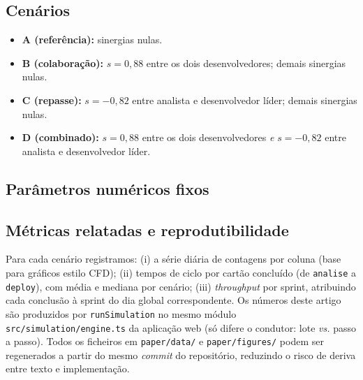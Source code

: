 \subsection{Cenários}
\begin{itemize}
  \item \textbf{A (referência):} sinergias nulas.
  \item \textbf{B (colaboração):} $s=0{,}88$ entre os dois desenvolvedores; demais sinergias nulas.
  \item \textbf{C (repasse):} $s=-0{,}82$ entre analista e desenvolvedor líder; demais sinergias nulas.
  \item \textbf{D (combinado):} $s=0{,}88$ entre os dois desenvolvedores \emph{e} $s=-0{,}82$ entre analista e desenvolvedor líder.
\end{itemize}

\subsection{Parâmetros numéricos fixos}
\begin{table}[htbp]
  \centering
  \caption{Parâmetros globais usados nos experimentos (gerados a partir do código).}
  \label{tab:param}
  
\end{table}

\subsection{Métricas relatadas e reprodutibilidade}
Para cada cenário registramos: (i) a série diária de contagens por coluna (base para gráficos estilo CFD); (ii) tempos de ciclo por cartão concluído (de \texttt{analise} a \texttt{deploy}), com média e mediana por cenário; (iii) \emph{throughput} por sprint, atribuindo cada conclusão à sprint do dia global correspondente. Os números deste artigo são produzidos por \texttt{runSimulation} no mesmo módulo \texttt{src/simulation/engine.ts} da aplicação web (só difere o condutor: lote \emph{vs.} passo a passo). Todos os ficheiros em \texttt{paper/data/} e \texttt{paper/figures/} podem ser regenerados a partir do mesmo \emph{commit} do repositório, reduzindo o risco de deriva entre texto e implementação.
